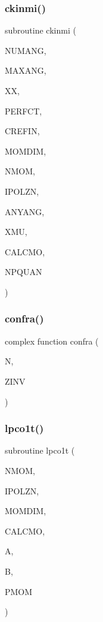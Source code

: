 \subsubsection{\texorpdfstring{ckinmi()}{ckinmi()}}
{\footnotesize\ttfamily subroutine ckinmi (\begin{DoxyParamCaption}\item[{integer}]{N\+U\+M\+A\+NG,  }\item[{integer}]{M\+A\+X\+A\+NG,  }\item[{real}]{XX,  }\item[{logical}]{P\+E\+R\+F\+CT,  }\item[{complex}]{C\+R\+E\+F\+IN,  }\item[{integer}]{M\+O\+M\+D\+IM,  }\item[{integer}]{N\+M\+OM,  }\item[{integer}]{I\+P\+O\+L\+ZN,  }\item[{logical}]{A\+N\+Y\+A\+NG,  }\item[{real, dimension( $\ast$ )}]{X\+MU,  }\item[{logical, dimension( $\ast$ )}]{C\+A\+L\+C\+MO,  }\item[{integer}]{N\+P\+Q\+U\+AN }\end{DoxyParamCaption})}

\mbox{\label{_m_i_e_v0_8f_ad91aace4d77229d367c28c78965a0bd5}} 
\subsubsection{\texorpdfstring{confra()}{confra()}}
{\footnotesize\ttfamily complex function confra (\begin{DoxyParamCaption}\item[{integer}]{N,  }\item[{complex}]{Z\+I\+NV }\end{DoxyParamCaption})}

\mbox{\label{_m_i_e_v0_8f_a6fcb83505689f74c82cf122a250675b6}} 
\subsubsection{\texorpdfstring{lpco1t()}{lpco1t()}}
{\footnotesize\ttfamily subroutine lpco1t (\begin{DoxyParamCaption}\item[{integer}]{N\+M\+OM,  }\item[{integer}]{I\+P\+O\+L\+ZN,  }\item[{integer}]{M\+O\+M\+D\+IM,  }\item[{logical, dimension( $\ast$ )}]{C\+A\+L\+C\+MO,  }\item[{complex, dimension( $\ast$ )}]{A,  }\item[{complex, dimension( $\ast$ )}]{B,  }\item[{real, dimension( 0\+:momdim, $\ast$ )}]{P\+M\+OM }\end{DoxyParamCaption})}

